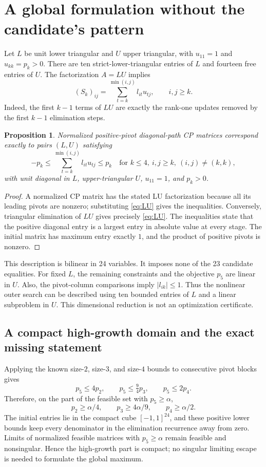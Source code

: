 \documentclass[11pt,letterpaper]{article}
\newtheorem{proposition}[theorem]{Proposition}
\begin{document}
\section{A global formulation without the candidate's pattern}\label{sec:global}
Let $L$ be unit lower triangular and $U$ upper triangular, with $u_{11}=1$ and $u_{kk}=p_k>0$. There are ten strict-lower-triangular entries of $L$ and fourteen free entries of $U$. The factorization $A=LU$ implies
\begin{equation}\label{eq:LU}
        (S_k)_{ij}=\sum_{t=k}^{\min(i,j)}l_{it}u_{tj},
             \qquad i,j\ge k.
\end{equation}
Indeed, the first $k-1$ terms of $LU$ are exactly the rank-one updates removed by the first $k-1$ elimination steps.

\begin{proposition}\label{prop:global}
Normalized positive-pivot diagonal-path CP matrices correspond exactly to pairs $(L,U)$ satisfying
\begin{equation}\label{eq:globalconstraints}
 -p_k\le\sum_{t=k}^{\min(i,j)}l_{it}u_{tj}\le p_k
 \quad\text{for } k\le4,\ i,j\ge k,\ (i,j)\ne(k,k),
\end{equation}
with unit diagonal in $L$, upper-triangular $U$, $u_{11}=1$, and $p_k>0$.
\end{proposition}
\begin{proof}
A normalized CP matrix has the stated LU factorization because all its leading pivots are nonzero; substituting \eqref{eq:LU} gives the inequalities. Conversely, triangular elimination of $LU$ gives precisely \eqref{eq:LU}. The inequalities state that the positive diagonal entry is a largest entry in absolute value at every stage. The initial matrix has maximum entry exactly $1$, and the product of positive pivots is nonzero.
\end{proof}
This description is bilinear in 24 variables. It imposes none of the 23 candidate equalities. For fixed $L$, the remaining constraints and the objective $p_5$ are linear in $U$. Also, the pivot-column comparisons imply $|l_{ik}|\le1$. Thus the nonlinear outer search can be described using ten bounded entries of $L$ and a linear subproblem in $U$. This dimensional reduction is not an optimization certificate.

\subsection{A compact high-growth domain and the exact missing statement}
Applying the known size-$2$, size-$3$, and size-$4$ bounds to consecutive pivot blocks gives
\[
 p_5\le4p_2,\qquad p_5\le\tfrac94p_3,\qquad p_5\le2p_4.
\]
Therefore, on the part of the feasible set with $p_5\ge\alpha$,
\[
 p_2\ge\alpha/4,\qquad p_3\ge4\alpha/9,\qquad p_4\ge\alpha/2.
\]
The initial entries lie in the compact cube $[-1,1]^{24}$, and these positive lower bounds keep every denominator in the elimination recurrence away from zero. Limits of normalized feasible matrices with $p_5\ge\alpha$ remain feasible and nonsingular. Hence the high-growth part is compact; no singular limiting escape is needed to formulate the global maximum.
\end{document}
